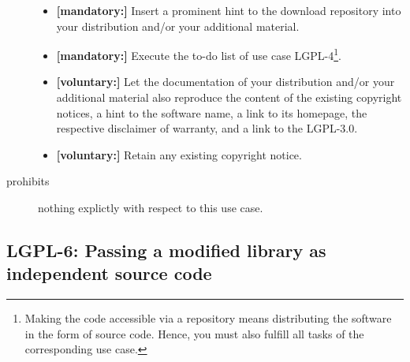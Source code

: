 \begin{description}
\begin{itemize}
  \item \textbf{[mandatory:]} Insert a prominent hint to the download repository
  into your distribution and/or your additional material.
  
  \item \textbf{[mandatory:]} Execute the to-do list of use case LGPL-4\footnote{
  Making the code accessible via a repository means distributing the software in
  the form of source code. Hence, you must also fulfill all tasks of the
  corresponding use case.}.
    
  \item \textbf{[voluntary:]} Let the documentation of your distribution and/or
  your additional material also reproduce the content of the existing
  copyright notices, a hint to the software name, a link to its homepage,
  the respective disclaimer of warranty, and a link to the LGPL-3.0.
  
  \item \textbf{[voluntary:]} Retain any existing copyright notice. 


\end{itemize}

\item[prohibits] nothing explictly with respect to this use case.

\end{description}

\subsection{LGPL-6: Passing a modified library as independent source code}
\label{OSUC-08-LGPL}

